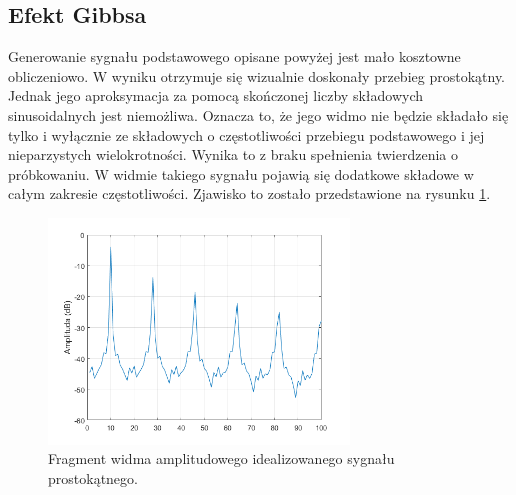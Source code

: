 \subsection{Efekt Gibbsa}\label{sec:gibbs}
Generowanie sygnału podstawowego opisane powyżej jest mało kosztowne obliczeniowo. W wyniku otrzymuje się wizualnie doskonały przebieg prostokątny. Jednak jego aproksymacja za pomocą skończonej liczby składowych sinusoidalnych jest niemożliwa. Oznacza to, że jego widmo nie będzie składało się tylko i wyłącznie ze składowych o częstotliwości przebiegu podstawowego i jej nieparzystych wielokrotności. Wynika to z braku spełnienia twierdzenia o próbkowaniu. 
W widmie takiego sygnału pojawią się dodatkowe składowe w całym zakresie częstotliwości. Zjawisko to zostało przedstawione na rysunku \ref{rys:sub_gibbs1}.
\begin{figure}[H]
	\centering
	\includegraphics[width=8cm]{grafiki/sub_gibbs1}
	\captionsetup{justification=centering}
	\caption{Fragment widma amplitudowego idealizowanego sygnału prostokątnego.}
	\label{rys:sub_gibbs1}
\end{figure}

